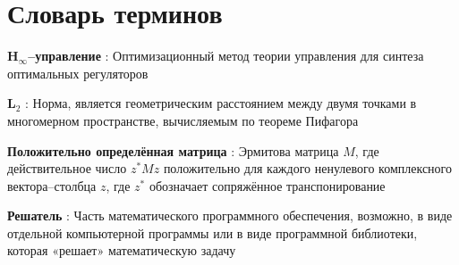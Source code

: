 \chapter*{Словарь терминов}             %

\textbf{\(\mathbf{H}_\infty\)--управление } : Оптимизационный метод теории управления для синтеза оптимальных регуляторов

\textbf{\(\mathbf{L}_2\)} : Норма, является геометрическим расстоянием между двумя точками в многомерном пространстве, вычисляемым по теореме Пифагора

\textbf{Положительно определённая матрица} : Эрмитова матрица $M$, где действительное число $z^* M z$ положительно для каждого ненулевого комплексного вектора--столбца $z$, где $z^*$ обозначает сопряжённое транспонирование

\textbf{Решатель} : Часть математического программного обеспечения, возможно, в виде отдельной компьютерной программы или в виде программной библиотеки, которая «решает» математическую задачу